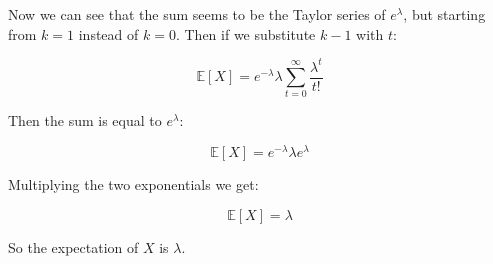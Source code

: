 \singlespacing

Now we can see that the sum seems to be the Taylor series of $e^{\lambda}$, but
starting from $k = 1$ instead of $k = 0$. Then if we substitute $k - 1$ with $t$:

\singlespacing

\begin{equation}
    \mathbb{E}[X] = e^{-\lambda} \lambda \sum_{t=0}^{\infty} \frac{\lambda^{t}}{t!}
\end{equation}

\singlespacing

\break

Then the sum is equal to $e^{\lambda}$:

\singlespacing

\begin{equation}
    \mathbb{E}[X] = e^{-\lambda} \lambda e^{\lambda}
\end{equation}

\singlespacing

Multiplying the two exponentials we get:

\singlespacing

\begin{equation}
    \mathbb{E}[X] = \lambda
\end{equation}

\singlespacing

So the expectation of $X$ is $\lambda$.